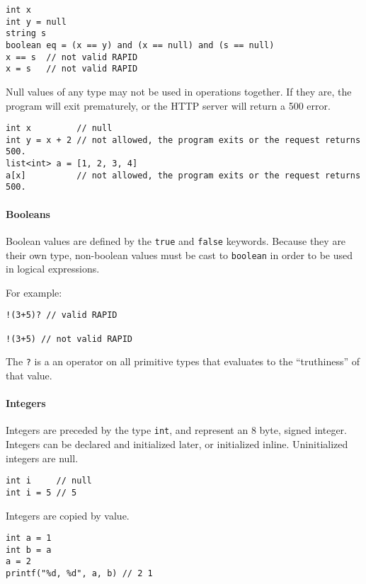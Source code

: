 \begin{verbatim}
int x
int y = null
string s
boolean eq = (x == y) and (x == null) and (s == null)
x == s  // not valid RAPID
x = s   // not valid RAPID
\end{verbatim}

Null values of any type may not be used in operations together. If they
are, the program will exit prematurely, or the HTTP server will return a
500 error.

\begin{verbatim}
int x         // null
int y = x + 2 // not allowed, the program exits or the request returns 500.
list<int> a = [1, 2, 3, 4]
a[x]          // not allowed, the program exits or the request returns 500.
\end{verbatim}

\paragraph{Booleans}\label{booleans}

Boolean values are defined by the \texttt{true} and \texttt{false}
keywords. Because they are their own type, non-boolean values must be
cast to \texttt{boolean} in order to be used in logical expressions.

For example:

\begin{verbatim}
!(3+5)? // valid RAPID

!(3+5) // not valid RAPID
\end{verbatim}

The \texttt{?} is a an operator on all primitive types that evaluates to
the ``truthiness'' of that value.

\paragraph{Integers}\label{integers}

Integers are preceded by the type \texttt{int}, and represent an 8 byte,
signed integer. Integers can be declared and initialized later, or
initialized inline. Uninitialized integers are null.

\begin{verbatim}
int i     // null
int i = 5 // 5
\end{verbatim}

Integers are copied by value.

\begin{verbatim}
int a = 1
int b = a
a = 2
printf("%d, %d", a, b) // 2 1
\end{verbatim}


